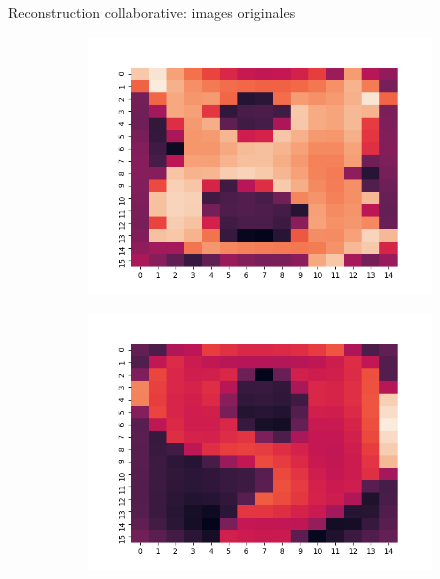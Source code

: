 \documentclass[hyperref={pdfpagelabels=false}]{beamer}
\begin{document}
\begin{frame}{Reconstruction collaborative: images originales}
\begin{figure}[h]
\begin{subfigure}[c]{0.18\textwidth}
                \includegraphics[scale=.12]{o8}
            \end{subfigure}
            \begin{subfigure}[c]{0.18\textwidth}
                \includegraphics[scale=.12]{o9}
            \end{subfigure}
        \end{figure}
    \end{frame}
\end{document}
